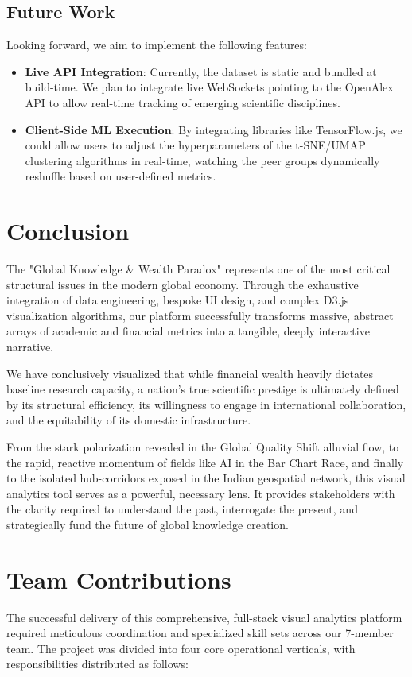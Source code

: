 \documentclass[12pt,a4paper]{article}
\begin{document}
\subsection{Future Work}
Looking forward, we aim to implement the following features:
\begin{itemize}
    \item \textbf{Live API Integration}: Currently, the dataset is static and bundled at build-time. We plan to integrate live WebSockets pointing to the OpenAlex API to allow real-time tracking of emerging scientific disciplines.
    \item \textbf{Client-Side ML Execution}: By integrating libraries like TensorFlow.js, we could allow users to adjust the hyperparameters of the t-SNE/UMAP clustering algorithms in real-time, watching the peer groups dynamically reshuffle based on user-defined metrics.
\end{itemize}

\newpage
\section{Conclusion}
The "Global Knowledge \& Wealth Paradox" represents one of the most critical structural issues in the modern global economy. Through the exhaustive integration of data engineering, bespoke UI design, and complex D3.js visualization algorithms, our platform successfully transforms massive, abstract arrays of academic and financial metrics into a tangible, deeply interactive narrative.

We have conclusively visualized that while financial wealth heavily dictates baseline research capacity, a nation's true scientific prestige is ultimately defined by its structural efficiency, its willingness to engage in international collaboration, and the equitability of its domestic infrastructure. 

From the stark polarization revealed in the Global Quality Shift alluvial flow, to the rapid, reactive momentum of fields like AI in the Bar Chart Race, and finally to the isolated hub-corridors exposed in the Indian geospatial network, this visual analytics tool serves as a powerful, necessary lens. It provides stakeholders with the clarity required to understand the past, interrogate the present, and strategically fund the future of global knowledge creation.

\newpage
\section{Team Contributions}
The successful delivery of this comprehensive, full-stack visual analytics platform required meticulous coordination and specialized skill sets across our 7-member team. The project was divided into four core operational verticals, with responsibilities distributed as follows:
\end{document}
